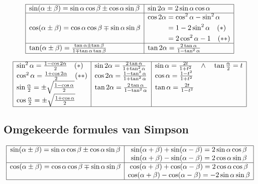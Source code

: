 \documentclass[a5paper]{article}
\begin{document}
{\[
\begin{array}{|l|l|}
\hline
\sin(\alpha \pm \beta) = \sin\alpha \cos\beta \pm \cos\alpha \sin\beta & \sin 2\alpha = 2\sin\alpha \cos\alpha \\
\hline
\cos(\alpha \pm \beta) = \cos\alpha \cos\beta \mp \sin\alpha \sin\beta & 
\begin{aligned}
\cos 2\alpha &= \cos^2\alpha - \sin^2\alpha \\
&= 1 - 2\sin^2\alpha \quad (*) \\
&= 2\cos^2\alpha - 1 \quad (**)
\end{aligned} \\
\hline
\tan(\alpha \pm \beta) = \frac{\tan\alpha \pm \tan\beta}{1 \mp \tan\alpha \tan\beta} & 
\tan 2\alpha = \frac{2\tan\alpha}{1 - \tan^2\alpha} \\
\hline
\end{array}
\]

\[
\begin{array}{|l|l|l|}
\hline
\sin^2\alpha = \frac{1 - \cos 2\alpha}{2} \quad (*) & \sin 2\alpha = \frac{2\tan\alpha}{1 + \tan^2\alpha} & 
\sin\alpha = \frac{2t}{1 + t^2} \quad \land \quad \tan\frac{\alpha}{2} = t \\
\cos^2\alpha = \frac{1 + \cos 2\alpha}{2} \quad (**) & \cos 2\alpha = \frac{1 - \tan^2\alpha}{1 + \tan^2\alpha} & 
\cos\alpha = \frac{1 - t^2}{1 + t^2} \\
\sin\frac{\alpha}{2} = \pm\sqrt{\frac{1 - \cos\alpha}{2}} & \tan 2\alpha = \frac{2\tan\alpha}{1 - \tan^2\alpha} & 
\tan\alpha = \frac{2t}{1 - t^2} \\
\cos\frac{\alpha}{2} = \pm\sqrt{\frac{1 + \cos\alpha}{2}} & & \\
\hline
\end{array}
\]
\subsection{Omgekeerde formules van Simpson}
\[
\begin{array}{|c|c|}
\hline
\sin(\alpha \pm \beta) = \sin\alpha\cos\beta \pm \cos\alpha\sin\beta & 
\sin(\alpha + \beta) + \sin(\alpha - \beta) = 2\sin\alpha\cos\beta \\
& 
\sin(\alpha + \beta) - \sin(\alpha - \beta) = 2\cos\alpha\sin\beta \\
\hline
\cos(\alpha \pm \beta) = \cos\alpha\cos\beta \mp \sin\alpha\sin\beta & 
\cos(\alpha + \beta) + \cos(\alpha - \beta) = 2\cos\alpha\cos\beta \\
& 
\cos(\alpha + \beta) - \cos(\alpha - \beta) = -2\sin\alpha\sin\beta \\
\hline
\end{array}
\]
}
\end{document}
